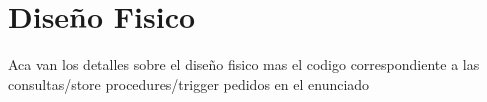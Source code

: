 \section{Diseño Fisico}

Aca van los detalles sobre el diseño fisico mas el codigo correspondiente a las consultas/store procedures/trigger pedidos en el enunciado